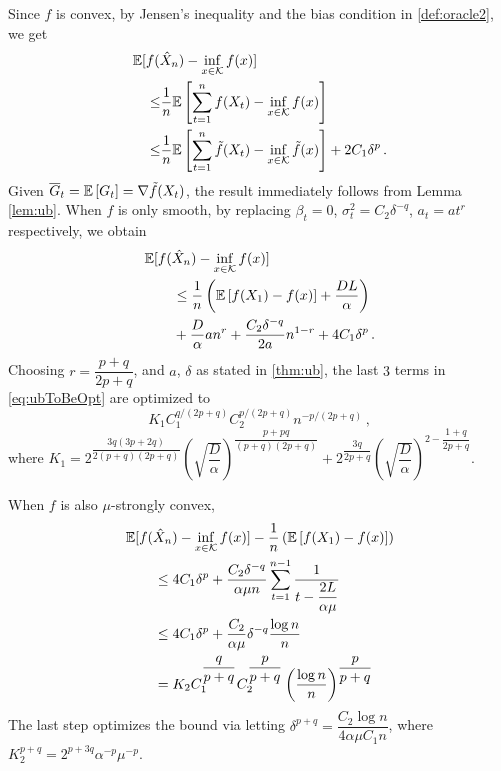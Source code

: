 Since $f$ is convex, by Jensen's inequality and the bias condition in \cref{def:oracle2}, we get
\begin{align*}
\MoveEqLeft
 \E[f(\hat X_n) - \inf_{x \in \cK} f(x)] \\
 \le&  
 \dfrac{1}{n}\EE{ \sum_{t=1}^n f(X_t) - \inf_{x \in \cK}f(x) } \\
 \le &\dfrac{1}{n}\EE{ \sum_{t=1}^n \tilde{f}(X_t) - \inf_{x \in \cK}\tilde{f}(x) } +2C_1 \delta^p
 \,.
\end{align*}
Given $\overline{G}_t=\mathbb{E}\left[G_t\right] = \nabla \tilde{f}(X_t)$,
the result immediately follows from Lemma \ref{lem:ub}. 
When $f$ is only smooth,
by replacing
 $\beta_t = 0$, $\sigma^2_t = C_2 \delta^{-q}$, $a_t=a t^r$ respectively, we obtain
 \begin{align}
 \MoveEqLeft
 \E[f(\hat X_n) - \inf_{x \in \cK} f(x)]  \nonumber\\
&\le \dfrac{1}{n}\left(\EE{f(X_1)-f(x)}+\dfrac{DL}{\alpha}  \right)\nonumber\\
&+\dfrac{D}{\alpha}a n^r+\dfrac{C_2 \delta^{-q}}{2a}n^{1-r}+ 4C_1\delta^p \,.
\label{eq:ubToBeOpt}
 \end{align}
 Choosing $r = \dfrac{p+q}{2p+q}$, and $a$, $\delta$ as stated in \cref{thm:ub}, the last $3$ terms in \eqref{eq:ubToBeOpt} are optimized to
 \[
 K_1 C_1^{q/(2p+q)} C_2^{p/(2p+q)} n ^{-p/(2p+q)} \,,
 \]
 where 
 $K_1 = 2^{\dfrac{3q(3p+2q)}{2(p+q)(2p+q)}} \left( \sqrt{\dfrac{D}{\alpha}} \right)^{\dfrac{p+pq}{(p+q)(2p+q)}}+2^{\dfrac{3q}{2p+q}} \left( \sqrt{\dfrac{D}{\alpha}} \right)^{2-\dfrac{1+q}{2p+q}}$.
 
 When $f$ is also $\mu$-strongly convex,
 \begin{align*}
 \MoveEqLeft
 \E[f(\hat X_n) - \inf_{x \in \cK} f(x)] -\dfrac{1}{n}\left(\EE{f(X_1)-f(x)}\right)\\
&\le 4C_1\delta^p+\dfrac{C_2 \delta^{-q}}{\alpha \mu n} \sum_{t=1}^{n-1}\dfrac{1}{t-\dfrac{2L}{\alpha \mu}}\\
&\le 4C_1\delta^p+\dfrac{C_2 }{\alpha \mu}\delta^{-q} \dfrac{\log n}{n}\\
&= K_2C_1^{\dfrac{q}{p+q}}C_2^{\dfrac{p}{p+q}} \left( \dfrac{\log n}{n} \right)^{\dfrac{p}{p+q}}
 \end{align*}
The last step optimizes the bound via letting 
$\delta^{p+q} =  \dfrac{C_2 \log n}{4\alpha \mu C_1 n}$, 
where
$K_2^{p+q}=2^{p+3q}\alpha^{-p}\mu^{-p}$.
